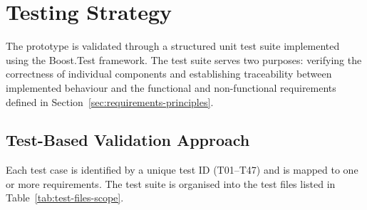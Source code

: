 \section{Testing Strategy}\label{sec:testing-strategy}

The prototype is validated through a structured unit test suite implemented using the Boost.Test framework. The test suite serves two purposes: verifying the correctness of individual components and establishing traceability between implemented behaviour and the functional and non-functional requirements defined in Section~\ref{sec:requirements-principles}.

\subsection{Test-Based Validation Approach}

Each test case is identified by a unique test ID (T01--T47) and is mapped to one or more requirements. The test suite is organised into the test files listed in Table~\ref{tab:test-files-scope}.


